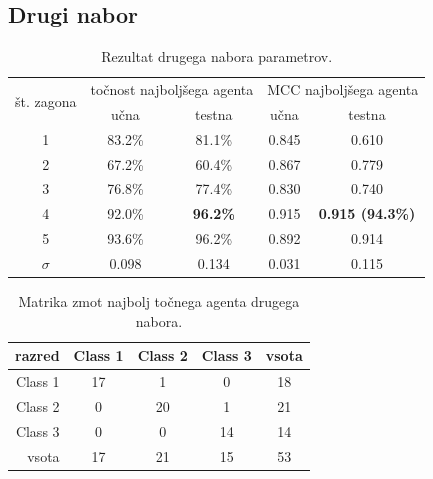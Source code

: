 \subsection{Drugi nabor}\label{subsec:dodatek-wine-drugi-nabor}
\begin{table}[H]
    \begin{center}
        \begin{tabular}{|| c | c c || c c ||}
            \hline
            \multirow{2}{*}{št. zagona} & \multicolumn{2}{c||}{točnost najboljšega agenta} & \multicolumn{2}{c||}{MCC najboljšega agenta} \\ \cline{2-5}
            & učna   & testna          & učna  & testna                  \\
            \hline
            1        & 83.2\% & 81.1\%          & 0.845 & 0.610                   \\
            \hline
            2        & 67.2\% & 60.4\%          & 0.867 & 0.779                   \\
            \hline
            3        & 76.8\% & 77.4\%          & 0.830 & 0.740                   \\
            \hline
            4        & 92.0\% & \textbf{96.2\%} & 0.915 & \textbf{0.915 (94.3\%)} \\
            \hline
            5        & 93.6\% & 96.2\%          & 0.892 & 0.914                   \\
            \hline
            $\sigma$ & 0.098  & 0.134           & 0.031 & 0.115                   \\
            \hline
        \end{tabular}
    \end{center}
    \caption{Rezultat drugega nabora parametrov.}
    \label{tab:wine_result_2}
\end{table}

\begin{table}[H]
    \centering
    \begin{tabular}{||rcccc||}
        \hline
        razred  & Class 1 & Class 2 & Class 3 & vsota \\ \hline
        Class 1 & 17      & 1       & 0       & 18    \\ \hline
        Class 2 & 0       & 20      & 1       & 21    \\ \hline
        Class 3 & 0       & 0       & 14      & 14    \\ \hline
        vsota   & 17      & 21      & 15      & 53    \\ \hline
    \end{tabular}
    \caption{Matrika zmot najbolj točnega agenta drugega nabora.}
    \label{tab:wine_acc_2}
\end{table}

